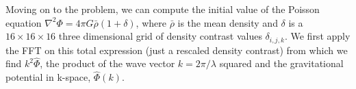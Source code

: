 Moving on to the problem, we can compute the initial value of the Poisson equation $\nabla^2 \Phi = 4\pi G \bar{\rho} (1 + \delta)$, where $\bar{\rho}$ is the mean density and $\delta$ is a $16 \times 16 \times 16$ three dimensional grid of density contrast values $\delta_{i,j,k}$. We first apply the FFT on this total expression (just a rescaled density contrast) from which we find $k^2 \hat{\Phi}$, the product of the wave vector $k = 2\pi/\lambda$ squared and the gravitational potential in k-space, $\hat{\Phi}(k)$.















